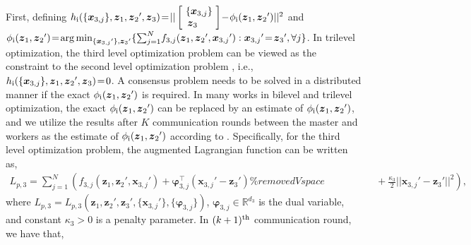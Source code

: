 \documentclass[letterpaper]{article} %
\begin{document}
First, defining  $h_{\rm{\uppercase\expandafter{\romannumeral1}}}(\{{\boldsymbol{x}_{3,j}}\},\boldsymbol{z}_1, {\boldsymbol{z}_2}',\boldsymbol{z}_3 ) \!=\!||\left[ \begin{array}{l}
    \! \{{\boldsymbol{x}_{3,j}}\} \! \\
     \boldsymbol{z}_3
\end{array} \right]  \!-\!\phi_{{\rm{\uppercase\expandafter{\romannumeral1}}}}({\boldsymbol{z}_1},{\boldsymbol{z}_2}')||^2 $ and $\phi_{\rm{\uppercase\expandafter{\romannumeral1}}}({\boldsymbol{z}_1},{\boldsymbol{z}_2}')\!=\! \mathop{\arg \min }\nolimits_{\{{\boldsymbol{x}_{3,j}}'\},{\boldsymbol{z}_3}'}\{ \sum\nolimits_{j=1}^N \! {{f_{3,j}}({\boldsymbol{z}_1},{\boldsymbol{z}_2}',{\boldsymbol{x}_{3,j}}')}: {\boldsymbol{x}_{3,j}}' \!=\! {\boldsymbol{z}_3}',\forall j\}$.  In trilevel optimization, the third level optimization problem can be viewed as the constraint to the second level optimization problem \cite{chen2022trilevel}, i.e., $h_{\rm{\uppercase\expandafter{\romannumeral1}}}(\{{\boldsymbol{x}_{3,j}}\},\boldsymbol{z}_1, {\boldsymbol{z}_2}',\boldsymbol{z}_3 )\!=\!0$.  A consensus problem needs to be solved in a distributed manner if the exact $\phi_{\rm{\uppercase\expandafter{\romannumeral1}}}({\boldsymbol{z}_1},{\boldsymbol{z}_2}')$ is required. In many works in bilevel \cite{ji2021bilevel,liu2021towards,jiao2022asynchronous} and trilevel \cite{sato2021gradient} optimization, the exact $\phi_{\rm{\uppercase\expandafter{\romannumeral1}}}({\boldsymbol{z}_1},{\boldsymbol{z}_2}')$ can be replaced by an estimate of $\phi_{\rm{\uppercase\expandafter{\romannumeral1}}}({\boldsymbol{z}_1},{\boldsymbol{z}_2}')$, and we utilize the results after $K$ communication rounds between the master and workers as the estimate of $\phi_{\rm{\uppercase\expandafter{\romannumeral1}}}({\boldsymbol{z}_1},{\boldsymbol{z}_2}')$ according to \cite{jiao2022asynchronous}. Specifically, for the third level optimization problem, the augmented Lagrangian function can be written as,
\begin{equation}
\begin{array}{l}
\! L_{p,3} \!=\! \sum\nolimits_{j = 1}^N ( {{f_{3,j}}({\boldsymbol{z}_1},{\boldsymbol{z}_2}'\!,{\boldsymbol{x}_{3,j}}')} + {\boldsymbol{\varphi}_{3,j}^{\top}}({\boldsymbol{x}_{3,j}}'- {\boldsymbol{z}_3}') \%removedVspace
\qquad \qquad \quad \, + \frac{\kappa_3}{2}||{\boldsymbol{x}_{3,j}}'- {\boldsymbol{z}_3}'||^2 ),
\end{array}
\end{equation}
where $L_{p,3} = L_{p,3}({\boldsymbol{z}_1},\!{\boldsymbol{z}_2}'\!, {\boldsymbol{z}_3}'\!,\! \{{\boldsymbol{x}_{3,j}}'\},\! \{\boldsymbol{\varphi}_{3,j}\})$, $\boldsymbol{\varphi}_{3,j} \!\in\! \mathbb{R}^{d_3}$ is the dual variable, and constant $\kappa_3\!>\!0$ is a penalty parameter. In $(k+1)^{\rm{th}}$ communication round, we have that,
\end{document}
